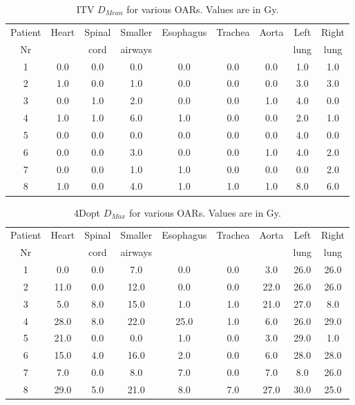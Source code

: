 \begin{table}[H]
  \centering
  \caption{ITV $D_{Mean}$ for various OARs. Values are in Gy.}
  \begin{tabular}{c|c|c|c|c|c|c|c|c}
   Patient & \multirow{2}{*}{Heart} & Spinal  & Smaller  & \multirow{2}{*}{Esophagus} & \multirow{2}{*}{Trachea} & \multirow{2}{*}{Aorta} & Left  & Right \\
   Nr & & cord & airways & & & & lung & lung \\
 \hline\hline 
1 & 0.0 & 0.0 & 0.0 & 0.0 & 0.0 & 0.0 & 1.0 & 1.0 \\ 
2 & 1.0 & 0.0 & 1.0 & 0.0 & 0.0 & 0.0 & 3.0 & 3.0 \\ 
3 & 0.0 & 1.0 & 2.0 & 0.0 & 0.0 & 1.0 & 4.0 & 0.0 \\ 
4 & 1.0 & 1.0 & 6.0 & 1.0 & 0.0 & 0.0 & 2.0 & 1.0 \\ 
5 & 0.0 & 0.0 & 0.0 & 0.0 & 0.0 & 0.0 & 4.0 & 0.0 \\ 
6 & 0.0 & 0.0 & 3.0 & 0.0 & 0.0 & 1.0 & 4.0 & 2.0 \\ 
7 & 0.0 & 0.0 & 1.0 & 1.0 & 0.0 & 0.0 & 0.0 & 2.0 \\ 
8 & 1.0 & 0.0 & 4.0 & 1.0 & 1.0 & 1.0 & 8.0 & 6.0 \\ 
\hline\hline
  \end{tabular}
  \label{tab:oarlimits1}
\end{table}

\begin{table}[H]
  \centering
  \caption{4Dopt $D_{Max}$ for various OARs. Values are in Gy.}
  \begin{tabular}{c|c|c|c|c|c|c|c|c}
   Patient & \multirow{2}{*}{Heart} & Spinal  & Smaller  & \multirow{2}{*}{Esophagus} & \multirow{2}{*}{Trachea} & \multirow{2}{*}{Aorta} & Left  & Right \\
   Nr & & cord & airways & & & & lung & lung \\
 \hline\hline 
1 & 0.0 & 0.0 & 7.0 & 0.0 & 0.0 & 3.0 & 26.0 & 26.0 \\ 
2 & 11.0 & 0.0 & 12.0 & 0.0 & 0.0 & 22.0 & 26.0 & 26.0 \\ 
3 & 5.0 & 8.0 & 15.0 & 1.0 & 1.0 & 21.0 & 27.0 & 8.0 \\ 
4 & 28.0 & 8.0 & 22.0 & 25.0 & 1.0 & 6.0 & 26.0 & 29.0 \\ 
5 & 21.0 & 0.0 & 0.0 & 1.0 & 0.0 & 3.0 & 29.0 & 1.0 \\ 
6 & 15.0 & 4.0 & 16.0 & 2.0 & 0.0 & 6.0 & 28.0 & 28.0 \\ 
7 & 7.0 & 0.0 & 8.0 & 7.0 & 0.0 & 7.0 & 8.0 & 26.0 \\ 
8 & 29.0 & 5.0 & 21.0 & 8.0 & 7.0 & 27.0 & 30.0 & 25.0 \\ 
\hline\hline
  \end{tabular}
  \label{tab:oarlimits1}
\end{table}

